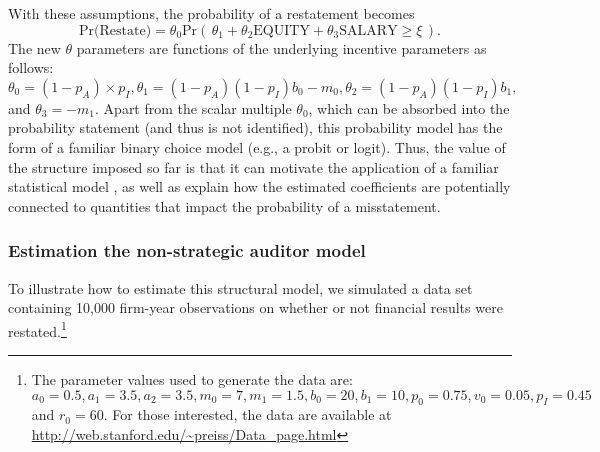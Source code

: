 \documentclass[12pt,reqno,titlepage]{amsart}
\theoremstyle{definition}
\begin{document}
\begin{doublespace}
With these assumptions, the probability of a restatement becomes
\begin{equation} \label{restate1}
\mbox{Pr(Restate)} = \theta_0 \mbox{Pr}\left(\, \theta_1 + \theta_2 \mbox{EQUITY} + \theta_3 \mbox{SALARY}  \ge \xi \,\right) .
\end{equation}
The new $\theta$ parameters are functions of the underlying incentive parameters as
follows: $\theta_0=(1-p_A) \times p_I, \theta_1 = (1 - p_A)(1 - p_I) b_0 - m_0, 
\theta_2 = (1 - p_A)(1 - p_I) b_1,$ and $\theta_3 = - m_1$. 
Apart from the scalar multiple $\theta_0$, which can be absorbed into the probability statement (and thus is not identified), this probability model has the form of a familiar binary choice model (e.g., a probit or logit).
Thus, the value of the structure imposed so far is that it can motivate the application of a familiar statistical model \citep[as in][]{Efendi:2007ja}, as well as explain how the estimated coefficients are potentially connected to quantities that impact the probability of a misstatement.


\subsubsection{Estimation the non-strategic auditor model}

To illustrate how to estimate this structural model, we simulated a data set containing 10,000 firm-year observations on whether or not financial results were restated.\footnote{The parameter values used to generate the data are: $a_0 = 0.5 , a_1 = 3.5 , a_2 = 3.5,
m_0 = 7, m_1 = 1.5, b_0 = 20, b_1 = 10, p_0 =0.75,
v_0 = 0.05, p_I = 0.45$ and $r_0 = 60$.
For those interested, the data are available at \url{http://web.stanford.edu/~preiss/Data_page.html}}


\end{doublespace}
\end{document}
